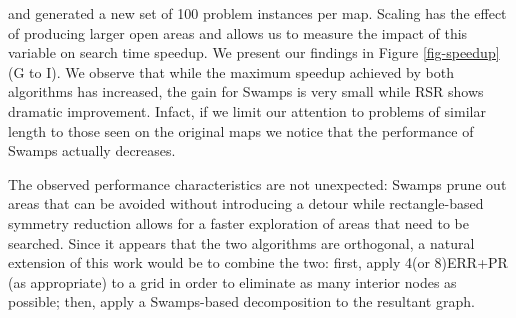 and generated a new set of 100 problem instances per map. 
Scaling has the effect of producing larger open areas and allows 
us to measure the impact of this variable on search time speedup.
We present our findings in  Figure \ref{fig-speedup} (G to I).
We observe that while the maximum speedup achieved by both algorithms has
increased, the gain for Swamps is very small while RSR shows dramatic
improvement.
Infact, if we limit our attention to problems of similar length to those seen 
on the original maps we notice that the performance of Swamps actually
decreases.
\par
The observed performance characteristics are not unexpected: 
Swamps prune out areas that can be avoided without introducing a detour while 
rectangle-based symmetry reduction allows for a faster exploration of areas that need to be searched.
Since it appears that the two algorithms are orthogonal, a natural extension of this work would 
be to combine the two: 
first, apply 4(or 8)ERR+PR (as appropriate) to a grid in order to eliminate as many interior nodes 
as possible; then, apply a Swamps-based decomposition to the resultant graph.
